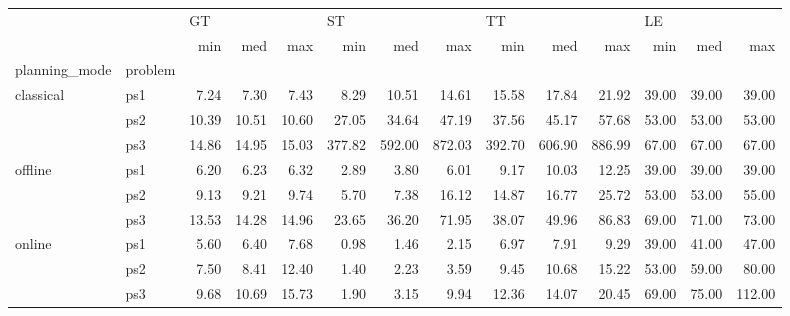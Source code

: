 \begin{tabular}{llrrrrrrrrrrrr}
\toprule
       &     & \multicolumn{3}{l}{GT} & \multicolumn{3}{l}{ST} & \multicolumn{3}{l}{TT} & \multicolumn{3}{l}{LE} \\
       &     &   min &   med &   max &    min &    med &    max &    min &    med &    max &   min &   med &    max \\
planning\_mode & problem &       &       &       &        &        &        &        &        &        &       &       &        \\
\midrule
classical & ps1 &  7.24 &  7.30 &  7.43 &   8.29 &  10.51 &  14.61 &  15.58 &  17.84 &  21.92 & 39.00 & 39.00 &  39.00 \\
       & ps2 & 10.39 & 10.51 & 10.60 &  27.05 &  34.64 &  47.19 &  37.56 &  45.17 &  57.68 & 53.00 & 53.00 &  53.00 \\
       & ps3 & 14.86 & 14.95 & 15.03 & 377.82 & 592.00 & 872.03 & 392.70 & 606.90 & 886.99 & 67.00 & 67.00 &  67.00 \\
offline & ps1 &  6.20 &  6.23 &  6.32 &   2.89 &   3.80 &   6.01 &   9.17 &  10.03 &  12.25 & 39.00 & 39.00 &  39.00 \\
       & ps2 &  9.13 &  9.21 &  9.74 &   5.70 &   7.38 &  16.12 &  14.87 &  16.77 &  25.72 & 53.00 & 53.00 &  55.00 \\
       & ps3 & 13.53 & 14.28 & 14.96 &  23.65 &  36.20 &  71.95 &  38.07 &  49.96 &  86.83 & 69.00 & 71.00 &  73.00 \\
online & ps1 &  5.60 &  6.40 &  7.68 &   0.98 &   1.46 &   2.15 &   6.97 &   7.91 &   9.29 & 39.00 & 41.00 &  47.00 \\
       & ps2 &  7.50 &  8.41 & 12.40 &   1.40 &   2.23 &   3.59 &   9.45 &  10.68 &  15.22 & 53.00 & 59.00 &  80.00 \\
       & ps3 &  9.68 & 10.69 & 15.73 &   1.90 &   3.15 &   9.94 &  12.36 &  14.07 &  20.45 & 69.00 & 75.00 & 112.00 \\
\bottomrule
\end{tabular}

